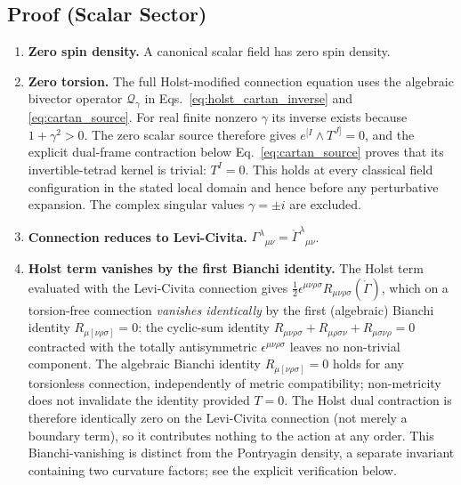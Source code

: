 \documentclass[aps,prd,twocolumn,superscriptaddress,preprintnumbers,nofootinbib,longbibliography,floatfix]{revtex4-2}
\begin{document}
\subsection{Proof (Scalar Sector)}\label{sec:transp_proof}

\begin{enumerate}
\item \textbf{Zero spin density.} A canonical scalar field has zero spin density.

\item \textbf{Zero torsion.} The full Holst-modified connection equation uses
the algebraic bivector operator $\mathcal Q_\gamma$ in
Eqs.~\eqref{eq:holst_cartan_inverse} and \eqref{eq:cartan_source}.  For real
finite nonzero $\gamma$ its inverse exists because $1+\gamma^2>0$.  The zero
scalar source therefore gives $e^{[I}\wedge T^{J]}=0$, and the explicit
dual-frame contraction below Eq.~\eqref{eq:cartan_source} proves that its
invertible-tetrad kernel is trivial: $T^I=0$.  This holds at every classical
field configuration in the stated local domain and hence before any
perturbative expansion.  The complex singular values $\gamma=\pm i$ are
excluded.

\item \textbf{Connection reduces to Levi-Civita.} $\Gamma^\lambda{}_{\mu\nu}
= \mathring{\Gamma}^\lambda{}_{\mu\nu}$.

\item \textbf{Holst term vanishes by the first Bianchi identity.}
The Holst term evaluated with
the Levi-Civita connection gives $\frac{1}{2}\epsilon^{\mu\nu\rho\sigma}
R_{\mu\nu\rho\sigma}(\mathring{\Gamma})$, which on a torsion-free
connection \emph{vanishes identically} by the first (algebraic) Bianchi identity
$R_{\mu[\nu\rho\sigma]} = 0$: the cyclic-sum identity $R_{\mu\nu\rho\sigma} +
R_{\mu\rho\sigma\nu} + R_{\mu\sigma\nu\rho} = 0$ contracted with the totally
antisymmetric $\epsilon^{\mu\nu\rho\sigma}$ leaves no non-trivial component.
The algebraic Bianchi identity $R_{\mu[\nu\rho\sigma]}=0$ holds for any
torsionless connection, independently of metric compatibility; non-metricity
does not invalidate the identity provided $T=0$.
The Holst dual contraction is therefore identically zero on the Levi-Civita
connection (not merely a boundary term), so it contributes nothing to the
action at any order. This Bianchi-vanishing is distinct from the Pontryagin
density, a separate invariant containing two curvature factors; see the
explicit verification below.

\end{enumerate}
\end{document}
